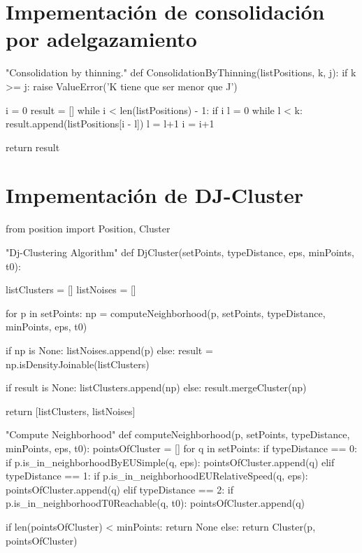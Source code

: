 \documentclass[a4paper, 12pt]{article}
\begin{document}
\newpage
\section{Impementaci\'on de consolidaci\'on por adelgazamiento} \label{App:AppendixB}

\begin{python}
"Consolidation by thinning."
def ConsolidationByThinning(listPositions, k, j):
	if k >= j:
		raise ValueError('K tiene que ser menor que J')
        
	i = 0
	result = []
	while i < len(listPositions) - 1:
		if i%
			l = 0
			while l < k:
				result.append(listPositions[i - l])
				l = l+1
			i = i+1

	return result
\end{python}


\newpage
\section{Impementaci\'on de DJ-Cluster} \label{App:AppendixC}

\begin{python}
from position import Position, Cluster

"Dj-Clustering Algorithm"
def DjCluster(setPoints, typeDistance, eps, minPoints, t0):

	listClusters = []
	listNoises = []

	for p in setPoints:
		np = computeNeighborhood(p, setPoints, typeDistance, minPoints, eps, t0)

		if np is None:
			listNoises.append(p) 
		else:
			result = np.isDensityJoinable(listClusters)

			if result is None:
				listClusters.append(np) 
			else:
				result.mergeCluster(np)

	return [listClusters, listNoises]

"Compute Neighborhood"
def computeNeighborhood(p, setPoints, typeDistance, minPoints, eps, t0):
	pointsOfCluster = []
	for q in setPoints:
		if typeDistance == 0:
			if p.is_in_neighborhoodByEUSimple(q, eps):
				pointsOfCluster.append(q)
		elif typeDistance == 1:
			if p.is_in_neighborhoodEURelativeSpeed(q, eps):
				pointsOfCluster.append(q)
		elif typeDistance == 2:
			if p.is_in_neighborhoodT0Reachable(q, t0):
				pointsOfCluster.append(q)

	if len(pointsOfCluster) < minPoints:
		return None
	else:
		return Cluster(p, pointsOfCluster)			

\end{python}
\end{document}
